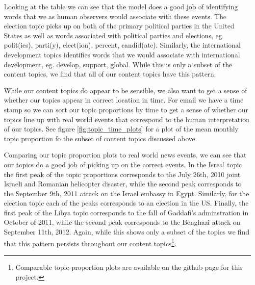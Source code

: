 \documentclass[12pt]{article}
\theoremstyle{definition}
\theoremstyle{algodesc}
\begin{document}
Looking at the table we can see that the model does a good job of identifying words that we as human observers would associate with these events.  The election topic picks up on both of the primary political parties in the United States as well as words associated with political parties and elections, eg. polit(ics), parti(y), elect(ion), percent, candid(ate).  Similarly, the international development topics identifies words that we would associate with international development, eg. develop, support, global.  While this is only a subset of the content topics, we find that all of our content topics have this pattern.

While our content topics do appear to be sensible, we also want to get a sense of whether our topics appear in correct location in time.  For email we have a time stamp so we can sort our topic proportions by time to get a sense of whether our topics line up with real world events that correspond to the human interpretation of our topics.  See figure \ref{fig:topic_time_plots} for a plot of the mean monthly topic proportion fo the subset of content topics discussed above.  

Comparing our topic proportion plots to real world news events, we can see that our topics do a good job of picking up on the correct events.  In the Isreal topic the first peak of the topic proportions corresponds to the July 26th, 2010 joint Israeli and Romanian helicopter disaster, while the second peak corresponds to the September 9th, 2011 attack on the Israel embassy in Egypt.  Similarly, for the election topic each of the peaks corresponds to an election in the US.  Finally, the first peak of the Libya topic corresponds to the fall of Gaddafi's adminstration in October of 2011, while the second peak corresponds to the Benghazi attack on September 11th, 2012.  Again, while this shows only a subset of the topics we find that this pattern persists throughout our content topics\footnote{Comparable topic proportion plots are available on the github page for this project.}.
\end{document}
